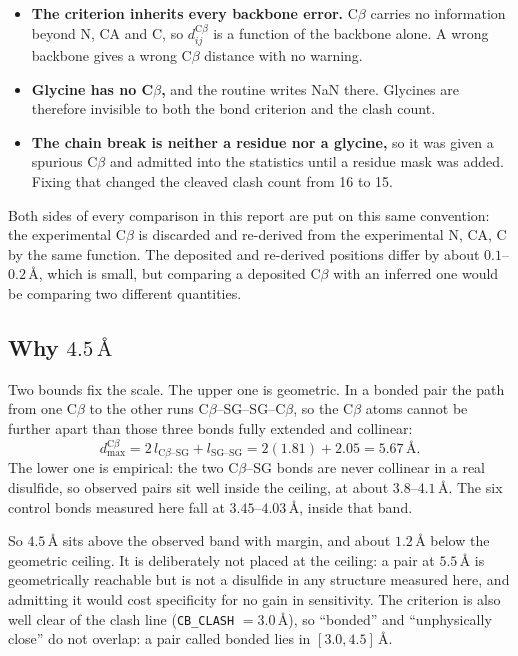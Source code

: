 \documentclass[11pt,a4paper]{article}
\newcommand{\ang}{\,\mbox{\AA}}
\begin{document}
\begin{itemize}
\item \textbf{The criterion inherits every backbone error.} C$\beta$ carries no
  information beyond N, CA and C, so $d^{\mathrm{C}\beta}_{ij}$ is a function of
  the backbone alone. A wrong backbone gives a wrong C$\beta$ distance with no
  warning.
\item \textbf{Glycine has no C$\beta$,} and the routine writes NaN there.
  Glycines are therefore invisible to both the bond criterion and the clash
  count.
\item \textbf{The chain break is neither a residue nor a glycine,} so it was
  given a spurious C$\beta$ and admitted into the statistics until a residue
  mask was added. Fixing that changed the cleaved clash count from 16 to 15.
\end{itemize}

Both sides of every comparison in this report are put on this same convention:
the experimental C$\beta$ is discarded and re-derived from the experimental
N, CA, C by the same function. The deposited and re-derived positions differ by
about $0.1$--$0.2\ang$, which is small, but comparing a deposited C$\beta$ with
an inferred one would be comparing two different quantities.

\subsection{\texorpdfstring{Why $4.5\ang$}{Why 4.5 A}}

Two bounds fix the scale. The upper one is geometric. In a bonded pair the path
from one C$\beta$ to the other runs C$\beta$--SG--SG--C$\beta$, so the C$\beta$
atoms cannot be further apart than those three bonds fully extended and
collinear:
\[
  d^{\mathrm{C}\beta}_{\max}
  = 2\,l_{\mathrm{C}\beta\text{--}\mathrm{SG}} + l_{\mathrm{SG}\text{--}\mathrm{SG}}
  = 2(1.81) + 2.05 = 5.67\ang .
\]
The lower one is empirical: the two C$\beta$--SG bonds are never collinear in a
real disulfide, so observed pairs sit well inside the ceiling, at about
$3.8$--$4.1\ang$. The six control bonds measured here fall at
$3.45$--$4.03\ang$, inside that band.

So $4.5\ang$ sits above the observed band with margin, and about $1.2\ang$
below the geometric ceiling. It is deliberately not placed at the ceiling: a
pair at $5.5\ang$ is geometrically reachable but is not a disulfide in any
structure measured here, and admitting it would cost specificity for no gain in
sensitivity. The criterion is also well clear of the clash line
(\texttt{CB\_CLASH} $= 3.0\ang$), so ``bonded'' and ``unphysically close'' do
not overlap: a pair called bonded lies in $[3.0, 4.5]\ang$.
\end{document}
